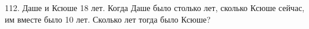 112. Даше и Ксюше 18 лет. Когда Даше было столько лет, сколько Ксюше сейчас, им вместе было 10 лет. Сколько лет тогда было Ксюше?\\
